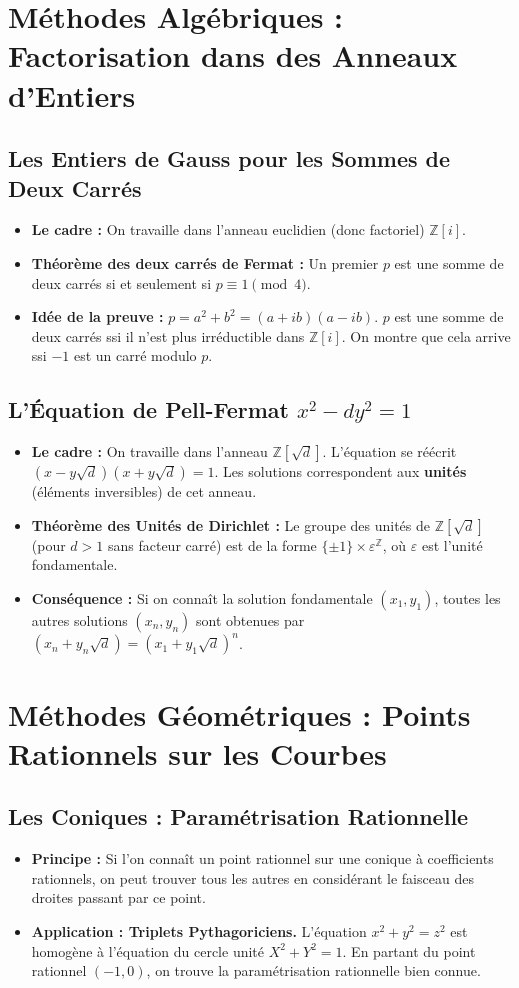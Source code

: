 \documentclass[12pt, a4paper, parskip=full]{report}
\theoremstyle{agregstyle}
\begin{document}
\section{Méthodes Algébriques : Factorisation dans des Anneaux d'Entiers}
\subsection{Les Entiers de Gauss pour les Sommes de Deux Carrés}
\begin{itemize}
    \item \textbf{Le cadre :} On travaille dans l'anneau euclidien (donc factoriel) $\mathbb{Z}[i]$.
    \item \textbf{Théorème des deux carrés de Fermat :} Un premier $p$ est une somme de deux carrés si et seulement si $p \equiv 1 \pmod 4$.
    \item \textbf{Idée de la preuve :} $p = a^2+b^2 = (a+ib)(a-ib)$. $p$ est une somme de deux carrés ssi il n'est plus irréductible dans $\mathbb{Z}[i]$. On montre que cela arrive ssi $-1$ est un carré modulo $p$.
\end{itemize}
\subsection{L'Équation de Pell-Fermat $x^2 - d y^2 = 1$}
\begin{itemize}
    \item \textbf{Le cadre :} On travaille dans l'anneau $\mathbb{Z}[\sqrt{d}]$. L'équation se réécrit $(x-y\sqrt{d})(x+y\sqrt{d})=1$. Les solutions correspondent aux \textbf{unités} (éléments inversibles) de cet anneau.
    \item \textbf{Théorème des Unités de Dirichlet :} Le groupe des unités de $\mathbb{Z}[\sqrt{d}]$ (pour $d>1$ sans facteur carré) est de la forme $\{\pm 1\} \times \varepsilon^\mathbb{Z}$, où $\varepsilon$ est l'unité fondamentale.
    \item \textbf{Conséquence :} Si on connaît la solution fondamentale $(x_1, y_1)$, toutes les autres solutions $(x_n, y_n)$ sont obtenues par $(x_n+y_n\sqrt{d}) = (x_1+y_1\sqrt{d})^n$.
\end{itemize}

\section{Méthodes Géométriques : Points Rationnels sur les Courbes}
\subsection{Les Coniques : Paramétrisation Rationnelle}
\begin{itemize}
    \item \textbf{Principe :} Si l'on connaît un point rationnel sur une conique à coefficients rationnels, on peut trouver tous les autres en considérant le faisceau des droites passant par ce point.
    \item \textbf{Application : Triplets Pythagoriciens.} L'équation $x^2+y^2=z^2$ est homogène à l'équation du cercle unité $X^2+Y^2=1$. En partant du point rationnel $(-1,0)$, on trouve la paramétrisation rationnelle bien connue.
\end{itemize}
\end{document}
